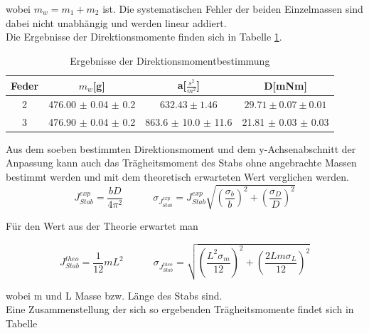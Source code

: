 \documentclass[12pt,a4paper]{article}
\begin{document}
wobei $m_w=m_1+m_2$ ist. Die systematischen Fehler der beiden Einzelmassen sind dabei nicht unabhängig und werden linear addiert.\\
Die Ergebnisse der Direktionsmomente finden sich in Tabelle \ref{tab:Direktionsmomente}.

\begin{table}
\caption{Ergebnisse der Direktionsmomentbestimmung}
\begin{center}
\begin{tabular}{|c|c|c|c|}
\hline
Feder & $m_w$[g] & a[$\frac{s^2}{m^2}$] & D[mNm]\\
\hline
2 & 476.00 $\pm$ 0.04 $\pm$ 0.2 & $632.43 \pm 1.46$ & $29.71 \pm 0.07 \pm 0.01$ \\
\hline
3 & 476.90 $\pm$ 0.04 $\pm$ 0.2 & 863.6 $\pm$ 10.0 $\pm$ 11.6 &  21.81 $\pm$ 0.03 $\pm$ 0.03 \\
\hline
\end{tabular}
\end{center}
\label{tab:Direktionsmomente}
\end{table}

Aus dem soeben bestimmten Direktionsmoment und dem y-Achsenabschnitt der Anpassung kann auch das Trägheitsmoment des Stabs ohne angebrachte Massen bestimmt werden und mit dem theoretisch erwarteten Wert verglichen werden.\\

\begin{equation}
J_{Stab}^{exp}=\frac{bD}{4\pi^2} \quad \quad \quad
\sigma_{J_{Stab}^{exp}}=J_{Stab}^{exp} \sqrt{(\frac{\sigma_b}{b})^2+(\frac{\sigma_D}{D})^2}
\end{equation}

Für den Wert aus der Theorie erwartet man

\begin{equation}
J_{Stab}^{theo}=\frac{1}{12} m L^2 \quad \quad \quad
\sigma_{J_{Stab}^{theo}}=\sqrt{(\frac{L^2 \sigma_m}{12})^2+(\frac{2Lm\sigma_L}{12})^2}
\end{equation}

wobei m und L Masse bzw. Länge des Stabs sind.\\
Eine Zusammenstellung der sich so ergebenden Trägheitsmomente findet sich in Tabelle
\end{document}
